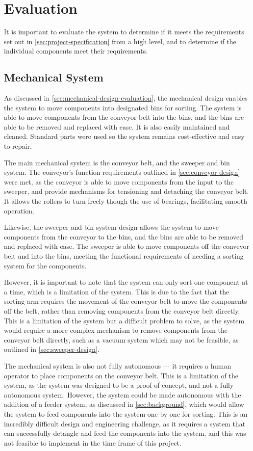 \section{Evaluation}
\label{sec:evaluation}
It is important to evaluate the system to determine if it meets the requirements set out in \autoref{sec:project-specification} from a high level, and to determine if the individual components meet their requirements. 

\subsection{Mechanical System}
As discussed in \autoref{sec:mechanical-design-evaluation}, the mechanical design enables the system to move components into designated bins for sorting. The system is able to move components from the conveyor belt into the bins, and the bins are able to be removed and replaced with ease. It is also easily maintained and cleaned. Standard parts were used so the system remains cost-effective and easy to repair. 

The main mechanical system is the conveyor belt, and the sweeper and bin system. The conveyor's function requirements outlined in \autoref{sec:conveyor-design} were met, as the conveyor is able to move components from the input to the sweeper, and provide mechanisms for tensioning and detaching the conveyor belt. It allows the rollers to turn freely though the use of bearings, facilitating smooth operation.

Likewise, the sweeper and bin system design allows the system to move components from the conveyor to the bins, and the bins are able to be removed and replaced with ease. The sweeper is able to move components off the conveyor belt and into the bins, meeting the functional requirements of needing a sorting system for the components.

However, it is important to note that the system can only sort one component at a time, which is a limitation of the system. This is due to the fact that the sorting arm requires the movement of the conveyor belt to move the components off the belt, rather than removing components from the conveyor belt directly. This is a limitation of the system but a difficult problem to solve, as the system would require a more complex mechanism to remove components from the conveyor belt directly, such as a vacuum system which may not be feasible, as outlined in \autoref{sec:sweeper-design}.

The mechanical system is also not fully autonomous --- it requires a human operator to place components on the conveyor belt. This is a limitation of the system, as the system was designed to be a proof of concept, and not a fully autonomous system. However, the system could be made autonomous with the addition of a feeder system, as discussed in \autoref{sec:background}, which would allow the system to feed components into the system one by one for sorting. This is an incredibly difficult design and engineering challenge, as it requires a system that can successfully detangle and feed the components into the system, and this was not feasible to implement in the time frame of this project.

